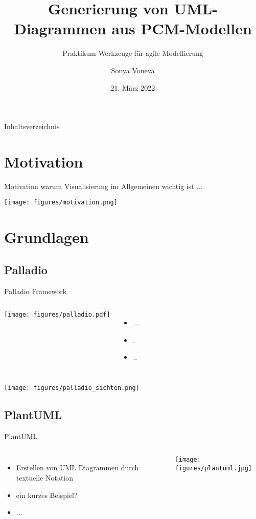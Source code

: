 \documentclass{sdqbeamer}
\title[Generierung von UML-Diagrammen
aus PCM-Modellen]{Generierung von UML-Diagrammen
aus PCM-Modellen}
\subtitle{Praktikum Werkzeuge für agile Modellierung}
\author[Voneva]{Sonya Voneva}
\date[21.\,3.\,2022]{21. März 2022}
\begin{document}
\KITtitleframe

\begin{frame}{Inhaltsverzeichnis}
\tableofcontents
\end{frame}

\section{Motivation}
\begin{frame}{Motivation}
    warum Visualisierung im Allgemeinen wichtig ist ...
\end{frame}

\begin{frame}[plain]
    \texttt{[image: figures/motivation.png]}
\end{frame}

\section{Grundlagen}
\subsection{Palladio}
\begin{frame}{Palladio Framework}
    \begin{columns}
        \texttt{[image: figures/palladio.pdf]}
        \begin{itemize}
            \item ...
            \item .
            \item ..
        \end{itemize}
    \end{columns}
\end{frame}
\begin{frame}
    \centering
    \texttt{[image: figures/palladio\_sichten.png]}
\end{frame}
\subsection{PlantUML}
\begin{frame}{PlantUML}
    \begin{columns}
            \begin{itemize}
                \item Erstellen von UML Diagrammen durch textuelle Notation
                \item ein kurzes Beispiel?
                \item ...
            \end{itemize}
            \texttt{[image: figures/plantuml.jpg]}
    \end{columns}
\end{frame}
\end{document}
